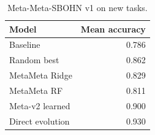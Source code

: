 \begin{table}[h]
\centering
\caption{Meta-Meta-SBOHN v1 on new tasks.}
\begin{tabular}{l r}
\hline
Model & Mean accuracy \\
\hline
Baseline & 0.786 \\
Random best & 0.862 \\
MetaMeta Ridge & 0.829 \\
MetaMeta RF & 0.811 \\
Meta-v2 learned & 0.900 \\
Direct evolution & 0.930 \\
\hline
\end{tabular}
\end{table}
